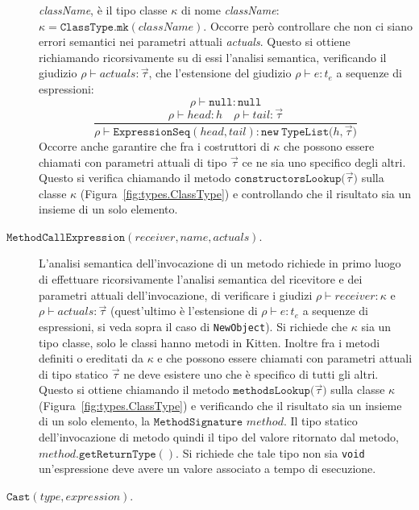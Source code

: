 \begin{description}
  \textit{className}, \`e il tipo classe $\kappa$ di nome \textit{className}:
  $\kappa=\mathtt{ClassType.mk(\mathit{className})}$.
  Occorre per\`o controllare che non ci siano errori semantici nei parametri
  attuali \textit{actuals}. Questo si ottiene richiamando ricorsivamente
  su di essi l'analisi semantica, \cioe verificando il giudizio
  $\rho\vdash\mathit{actuals}:\vec{\tau}$, che \e l'estensione del giudizio
  $\rho\vdash e:t_e$ a sequenze di espressioni:
  \[
    \rho\vdash\mathtt{null}:\mathtt{null}
  \]
  \[
    \frac{\rho\vdash\mathit{head}:h\quad\rho\vdash\mathit{tail}:\vec{\tau}}
         {\rho\vdash\mathtt{ExpressionSeq(\mathit{head},\mathit{tail})}:
          \mathtt{new\ TypeList(\mathit{h},}\vec{\tau})}
  \]
  Occorre anche garantire che fra i costruttori di $\kappa$ che possono essere
  chiamati con parametri attuali di tipo $\vec{\tau}$ ce ne sia uno \piu
  specifico degli altri. Questo si verifica chiamando il metodo
  $\mathtt{constructorsLookup(}\vec{\tau})$ sulla classe $\kappa$
  (Figura~\ref{fig:types.ClassType}) e controllando che il risultato
  sia un insieme di un solo elemento.
\item[\underline{$\mathtt{MethodCallExpression(\mathit{receiver},
      \mathit{name},\mathit{actuals})}$}.]
  L'analisi semantica dell'invocazione di un metodo richiede in primo
  luogo di effettuare ricorsivamente l'analisi semantica del ricevitore
  e dei parametri attuali dell'invocazione, \cioe di verificare i giudizi
  $\rho\vdash\mathit{receiver}:\kappa$ e
  $\rho\vdash\mathit{actuals}:\vec{\tau}$ (quest'ultimo \`e l'estensione
  di $\rho\vdash e:t_e$ a sequenze di espressioni, si veda sopra il caso
  di \texttt{NewObject}). Si richiede che $\kappa$ sia un tipo classe,
  \poiche solo le classi hanno metodi in Kitten. Inoltre fra i metodi
  definiti o ereditati da $\kappa$ e che possono essere chiamati con parametri
  attuali di tipo statico $\vec{\tau}$ ne deve esistere uno che \`e \piu
  specifico di tutti gli altri. Questo si ottiene chiamando il
  metodo $\mathtt{methodsLookup(}\vec{\tau})$ sulla classe $\kappa$
  (Figura~\ref{fig:types.ClassType}) e verificando che il risultato
  sia un insieme di un solo elemento, la $\mathtt{MethodSignature}$
  $\mathit{method}$. Il tipo statico dell'invocazione di metodo \e quindi
  il tipo del valore ritornato dal metodo, \cioe
  $\mathit{method}\mathtt{.getReturnType()}$. Si richiede che tale tipo non
  sia \texttt{void} \poiche un'espressione deve avere un valore
  associato a tempo di esecuzione.
\item[\underline{$\mathtt{Cast(\mathit{type},\mathit{expression})}$}.]

\end{description}
